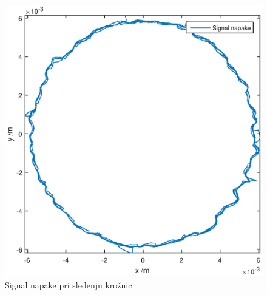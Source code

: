 \begin{figure}
	\centering
	\includegraphics[scale=0.5]{./Slike/follow_circle_err.eps}
	\caption{Signal napake pri sledenju krožnici}
	\label{fig:follow_circle_err}
\end{figure}
